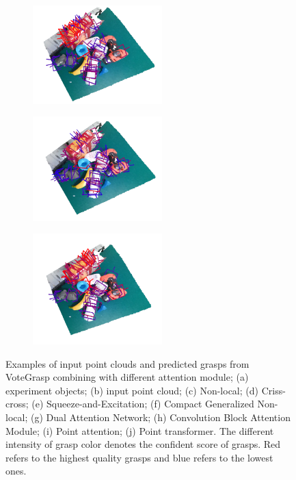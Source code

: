 \begin{figure}[h!]
    \begin{subfigure}[b]{0.25\linewidth}
    \includegraphics[width=5cm]{figs/Attention_module_results/CBAM.png}
    \caption{} 
  \end{subfigure} 
    \begin{subfigure}[b]{0.32\linewidth}
    \includegraphics[width=5cm]{figs/Attention_module_results/Point-Attention.png}
    \caption{} 
  \end{subfigure} 
    \begin{subfigure}[b]{0.32\linewidth}
    \includegraphics[width=5cm]{figs/Attention_module_results/Point_Transformer.png}
    \caption{} 
  \end{subfigure}
  
  \caption{Examples of input point clouds and predicted grasps from VoteGrasp combining with different attention module; (a) experiment objects; (b) input point cloud; (c) Non-local; (d) Criss-cross; (e) Squeeze-and-Excitation; (f) Compact Generalized Non-local; (g) Dual Attention Network; (h) Convolution Block Attention Module; (i) Point attention; (j) Point transformer. The different intensity of grasp color denotes the confident score of grasps. Red refers to the highest quality grasps and blue refers to the lowest ones.}
  \label{fig:grasp_pred_result}
\end{figure}

